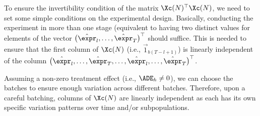 To ensure the invertibility condition of the matrix $\Xc(N)^\top \Xc(N)$, we need to set some simple conditions on the experimental design. Basically, conducting the experiment in more than one stage (equivalent to having two distinct values for elements of the vector $\big( \hat\expr_l, \ldots, \hat\expr_T \big)^\top$ should suffice. This is needed to ensure that the first column of $\Xc(N)$ (i.e., $\Vec{1}_{b(T-l+1)}$) is linearly independent of the column $\big(\hat\expr_l, \ldots, \hat\expr_T, \ldots, \hat\expr_l, \ldots, \hat\expr_T\big)^\top$. 

Assuming a non-zero treatment effect (i.e., $\ADE_h \neq 0$), we can choose the batches to ensure enough variation across different batches. Therefore, upon a careful batching, columns of $\Xc(N)$ are linearly independent as each has its own specific variation patterns over time and/or subpopulations. 

